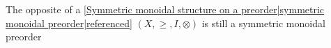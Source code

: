 
The opposite of a \ref{Symmetric monoidal structure on a preorder|symmetric monoidal preorder|referenced} $(X, \geq, I, \otimes)$ is still a symmetric monoidal preorder